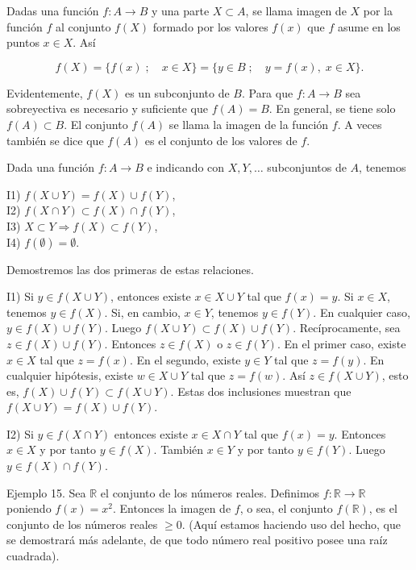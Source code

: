 Dadas una función \(f: A \to B\) y una parte \(X \subset A\), se llama imagen de \(X\) por la función \(f\) al conjunto \(f(X)\) formado por los valores \(f(x)\) que \(f\) asume en los puntos \(x \in X\). Así

\[
f(X) = \{f(x) \; ; \quad x \in X\} = \{y \in B \; ; \quad y = f(x), \; x \in X\}.
\]

Evidentemente, \(f(X)\) es un subconjunto de \(B\). Para que \(f: A \to B\) sea sobreyectiva es necesario y suficiente que \(f(A) = B\). En general, se tiene solo \(f(A) \subset B\). El conjunto \(f(A)\) se llama la imagen de la función \(f\). A veces también se dice que \(f(A)\) es el conjunto de los valores de \(f\).

Dada una función \(f: A \to B\) e indicando con \(X, Y, \dots\) subconjuntos de \(A\), tenemos

I1) \(f(X \cup Y) = f(X) \cup f(Y)\),  \\
I2) \(f(X \cap Y) \subset f(X) \cap f(Y)\),  \\
I3) \(X \subset Y \Rightarrow f(X) \subset f(Y)\),  \\
I4) \(f(\emptyset) = \emptyset\).

Demostremos las dos primeras de estas relaciones.

I1) Si \(y \in f(X \cup Y)\), entonces existe \(x \in X \cup Y\) tal que \(f(x) = y\). Si \(x \in X\), tenemos \(y \in f(X)\). Si, en cambio, \(x \in Y\), tenemos \(y \in f(Y)\). En cualquier caso, \(y \in f(X) \cup f(Y)\). Luego \(f(X \cup Y) \subset f(X) \cup f(Y)\). Recíprocamente, sea \(z \in f(X) \cup f(Y)\). Entonces \(z \in f(X)\) o \(z \in f(Y)\). En el primer caso, existe \(x \in X\) tal que \(z = f(x)\). En el segundo, existe \(y \in Y\) tal que \(z = f(y)\). En cualquier hipótesis, existe \(w \in X \cup Y\) tal que \(z = f(w)\). Así \(z \in f(X \cup Y)\), esto es, \(f(X) \cup f(Y) \subset f(X \cup Y)\). Estas dos inclusiones muestran que \(f(X \cup Y) = f(X) \cup f(Y)\).

I2) Si \(y \in f(X \cap Y)\) entonces existe \(x \in X \cap Y\) tal que \(f(x) = y\). Entonces \(x \in X\) y por tanto \(y \in f(X)\). También \(x \in Y\) y por tanto \(y \in f(Y)\). Luego \(y \in f(X) \cap f(Y)\).

Ejemplo 15. Sea \(\mathbb{R}\) el conjunto de los números reales. Definimos \(f: \mathbb{R} \to \mathbb{R}\) poniendo \(f(x) = x^2\). Entonces la imagen de \(f\), o sea, el conjunto \(f(\mathbb{R})\), es el conjunto de los números reales \(\geq 0\). (Aquí estamos haciendo uso del hecho, que se demostrará más adelante, de que todo número real positivo posee una raíz cuadrada).

